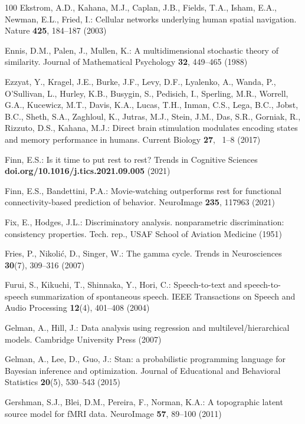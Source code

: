 \documentclass{llmxive}
\begin{document}
\begin{thebibliography}{100}
Ekstrom, A.D., Kahana, M.J., Caplan, J.B., Fields, T.A., Isham, E.A., Newman,
  E.L., Fried, I.: Cellular networks underlying human spatial navigation.
  Nature  \textbf{425},  184--187 (2003)

Ennis, D.M., Palen, J., Mullen, K.: A multidimensional stochastic theory of
  similarity. Journal of Mathematical Psychology  \textbf{32},  449--465 (1988)

Ezzyat, Y., Kragel, J.E., Burke, J.F., Levy, D.F., Lyalenko, A., Wanda, P.,
  O'Sullivan, L., Hurley, K.B., Busygin, S., Pedisich, I., Sperling, M.R.,
  Worrell, G.A., Kucewicz, M.T., Davis, K.A., Lucas, T.H., Inman, C.S., Lega,
  B.C., Jobst, B.C., Sheth, S.A., Zaghloul, K., Jutras, M.J., Stein, J.M., Das,
  S.R., Gorniak, R., Rizzuto, D.S., Kahana, M.J.: Direct brain stimulation
  modulates encoding states and memory performance in humans. Current Biology
  \textbf{27}, ~1--8 (2017)

Finn, E.S.: Is it time to put rest to rest? Trends in Cognitive Sciences
  \textbf{doi.org/10.1016/j.tics.2021.09.005} (2021)

Finn, E.S., Bandettini, P.A.: Movie-watching outperforms rest for functional
  connectivity-based prediction of behavior. {NeuroImage}  \textbf{235},
  117963 (2021)

Fix, E., Hodges, J.L.: Discriminatory analysis. nonparametric discrimination:
  consistency properties. Tech. rep., USAF School of Aviation Medicine (1951)

Fries, P., Nikoli{\'c}, D., Singer, W.: The gamma cycle. Trends in
  Neurosciences  \textbf{30}(7),  309--316 (2007)

Furui, S., Kikuchi, T., Shinnaka, Y., Hori, C.: Speech-to-text and
  speech-to-speech summarization of spontaneous speech. {IEEE} Transactions on
  Speech and Audio Processing  \textbf{12}(4),  401--408 (2004)

Gelman, A., Hill, J.: Data analysis using regression and
  multilevel/hierarchical models. Cambridge {University} Press (2007)

Gelman, A., Lee, D., Guo, J.: Stan: a probabilistic programming language for
  {Bayesian} inference and optimization. Journal of Educational and Behavioral
  Statistics  \textbf{20}(5),  530--543 (2015)

Gershman, S.J., Blei, D.M., Pereira, F., Norman, K.A.: A topographic latent
  source model for {fMRI} data. {NeuroImage}  \textbf{57},  89--100 (2011)


\end{thebibliography}
\end{document}
